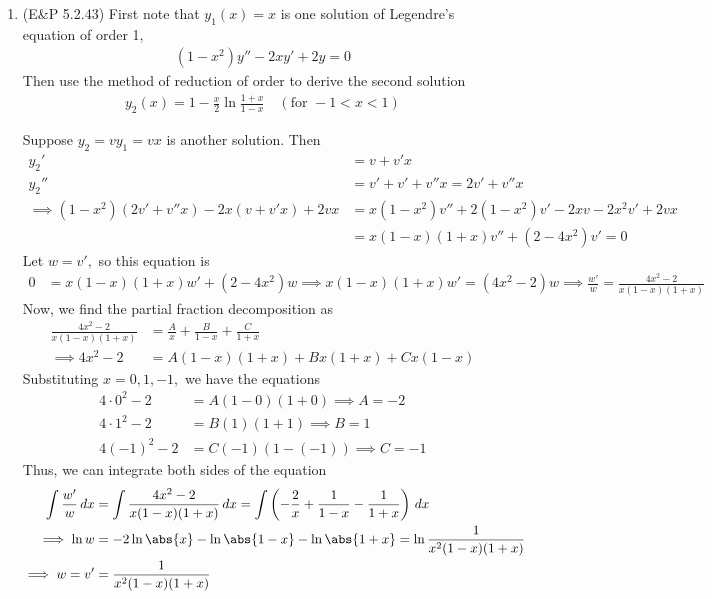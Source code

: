 \documentclass{article}
\begin{document}
\begin{enumerate}
	\item (E\&P 5.2.43) First note that $y_1(x)=x$ is one solution of Legendre's equation of order 1,
		\begin{align*}
			(1-x^2)y''-2xy'+2y=0
		\end{align*}
		Then use the method of reduction of order to derive the second solution
		\begin{align*}
			y_2(x)=1-\frac{x}{2}\ln\frac{1+x}{1-x} \quad (\text{for } -1<x<1)
		\end{align*}
		\begin{soln}
			Suppose $y_2=vy_1=vx$ is another solution. Then
			\begin{align*}
				y_2' &= v + v'x \\
				y_2'' &= v' + v' + v''x = 2v' + v''x \\
				\implies (1-x^2)(2v'+v''x) - 2x(v + v'x) + 2vx &= x(1-x^2)v'' + 2(1-x^2)v' - 2xv - 2x^2v' + 2vx \\
				&= x(1-x)(1+x)v'' + (2-4x^2)v' = 0
			\end{align*}
			Let $w=v',$ so this equation is
			\begin{align*}
				0 &= x(1-x)(1+x)w' + (2-4x^2)w \implies x(1-x)(1+x)w' = (4x^2-2)w \implies \frac{w'}{w} = \frac{4x^2-2}{x(1-x)(1+x)}
			\end{align*}
			Now, we find the partial fraction decomposition as
			\begin{align*}
				\frac{4x^2-2}{x(1-x)(1+x)} &= \frac{A}{x} + \frac{B}{1-x} + \frac{C}{1+x} \\
				\implies 4x^2-2 &=A(1-x)(1+x) + Bx(1+x) + Cx(1-x)
			\end{align*}
			Substituting $x=0, 1, -1,$ we have the equations
			\begin{align*}
				4\cdot 0^2-2 &= A(1-0)(1+0) \implies A = -2 \\
				4\cdot 1^2-2 &= B(1)(1+1)\implies B = 1 \\
				4(-1)^2-2 &= C(-1)(1-(-1)) \implies C= -1
			\end{align*}
			Thus, we can integrate both sides of the equation
			\begin{align*}
				\int \frac{w'}{w}\, dx &= \int \frac{4x^2-2}{x(1-x)(1+x)}\, dx = \int \left( -\frac{2}{x} + \frac{1}{1-x} - \frac{1}{1+x} \right)\, dx \\
				\implies \ln w &= -2\ln\abs{x} - \ln\abs{1-x} - \ln\abs{1+x} = \ln \frac{1}{x^2(1-x)(1+x)} \\
				\implies w =v' &= \frac{1}{x^2(1-x)(1+x)}
			\end{align*}

\end{soln}
\end{enumerate}
\end{document}
